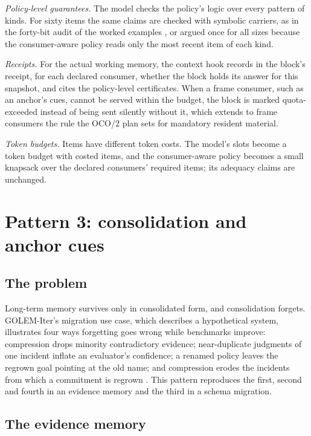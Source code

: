 \documentclass[11pt]{article}
\theoremstyle{definition}
\theoremstyle{plain}
\begin{document}
\emph{Policy-level guarantees.} The model checks the policy's logic over every pattern of kinds.
For sixty items the same claims are checked with symbolic carriers, as in the forty-bit audit of
the worked examples \cite[Section~4]{worked}, or argued once for all sizes because the
consumer-aware policy reads only the most recent item of each kind.

\emph{Receipts.} For the actual working memory, the context hook records in the block's receipt,
for each declared consumer, whether the block holds its answer for this snapshot, and cites the
policy-level certificates. When a frame consumer, such as an anchor's cues, cannot be served
within the budget, the block is marked quota-exceeded instead of being sent silently without it,
which extends to frame consumers the rule the OCO/2 plan sets for mandatory resident material.

\emph{Token budgets.} Items have different token costs. The model's slots become a token budget
with costed items, and the consumer-aware policy becomes a small knapsack over the declared
consumers' required items; its adequacy claims are unchanged.

\section{Pattern 3: consolidation and anchor cues}\label{sec:p3}

\subsection{The problem}

Long-term memory survives only in consolidated form, and consolidation forgets. GOLEM-Iter's
migration use case, which describes a hypothetical system, illustrates four ways forgetting goes
wrong while benchmarks improve: compression drops
minority contradictory evidence; near-duplicate judgments of one incident inflate an evaluator's
confidence; a renamed policy leaves the regrown goal pointing at the old name; and compression
erodes the incidents from which a commitment is regrown \cite{golemspec}. This pattern reproduces
the first, second and fourth in an evidence memory and the third in a schema migration.

\subsection{The evidence memory}
\end{document}
